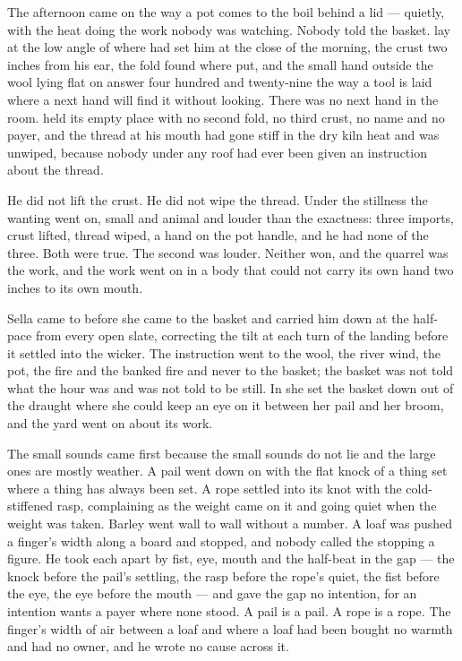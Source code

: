 The afternoon came on the way a pot comes to the boil behind a lid --- quietly, with the heat doing the work nobody was watching. Nobody told the basket.  lay at the low angle of  where  had set him at the close of the morning, the crust two inches from his ear, the fold found where put, and the small hand outside the wool lying flat on answer four hundred and twenty-nine the way a tool is laid where a next hand will find it without looking. There was no next hand in the room.  held its empty place with no second fold, no third crust, no name and no payer, and the thread at his mouth had gone stiff in the dry kiln heat and was unwiped, because nobody under any roof had ever been given an instruction about the thread.

He did not lift the crust. He did not wipe the thread. Under the stillness the wanting went on, small and animal and louder than the exactness: three imports, crust lifted, thread wiped, a hand on the pot handle, and he had none of the three. Both were true. The second was louder. Neither won, and the quarrel was the work, and the work went on in a body that could not carry its own hand two inches to its own mouth.

Sella came to  before she came to the basket and carried him down  at the half-pace from every open slate, correcting the tilt at each turn of the landing before it settled into the wicker. The instruction went to the wool, the river wind, the pot, the fire and the banked fire and never to the basket; the basket was not told what the hour was and was not told to be still. In  she set the basket down out of the draught where she could keep an eye on it between her pail and her broom, and the yard went on about its work.

The small sounds came first because the small sounds do not lie and the large ones are mostly weather. A pail went down on  with the flat knock of a thing set where a thing has always been set. A rope settled into its knot with the cold-stiffened rasp, complaining as the weight came on it and going quiet when the weight was taken. Barley went wall to wall without a number. A loaf was pushed a finger's width along a board and stopped, and nobody called the stopping a figure. He took each apart by fist, eye, mouth and the half-beat in the gap --- the knock before the pail's settling, the rasp before the rope's quiet, the fist before the eye, the eye before the mouth --- and gave the gap no intention, for an intention wants a payer where none stood. A pail is a pail. A rope is a rope. The finger's width of air between a loaf and where a loaf had been bought no warmth and had no owner, and he wrote no cause across it.

